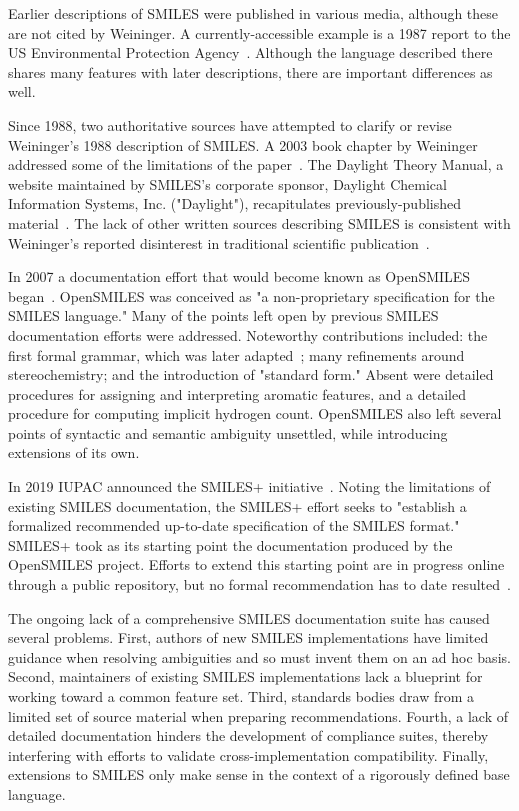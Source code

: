 \documentclass{article}
\begin{document}
Earlier descriptions of SMILES were published in various media, although these are not cited by Weininger. A currently-accessible example is a 1987 report to the US Environmental Protection Agency~\cite{anderson:1987}. Although the language described there shares many features with later descriptions, there are important differences as well.

Since 1988, two authoritative sources have attempted to clarify or revise Weininger's 1988 description of SMILES. A 2003 book chapter by Weininger addressed some of the limitations of the paper~\cite{weininger:2008}. The Daylight Theory Manual, a website maintained by SMILES's corporate sponsor, Daylight Chemical Information Systems, Inc. ("Daylight"), recapitulates previously-published material~\cite{daylightTheory}. The lack of other written sources describing SMILES is consistent with Weininger's reported disinterest in traditional scientific publication~\cite{gasteiger:2018}.

In 2007 a documentation effort that would become known as OpenSMILES began~\cite{openSMILES}. OpenSMILES was conceived as "a non-proprietary specification for the SMILES language." Many of the points left open by previous SMILES documentation efforts were addressed. Noteworthy contributions included: the first formal grammar, which was later adapted~\cite{denjoed:2010}; many refinements around stereochemistry; and the introduction of "standard form." Absent were detailed procedures for assigning and interpreting aromatic features, and a detailed procedure for computing implicit hydrogen count. OpenSMILES also left several points of syntactic and semantic ambiguity unsettled, while introducing extensions of its own.

In 2019 IUPAC announced the SMILES+ initiative~\cite{smilesPlusSpecification}. Noting the limitations of existing SMILES documentation, the SMILES+ effort seeks to "establish a formalized recommended up-to-date specification of the SMILES format." SMILES+ took as its starting point the documentation produced by the OpenSMILES project. Efforts to extend this starting point are in progress online through a public repository, but no formal recommendation has to date resulted~\cite{smilesPlusGitHub}.

The ongoing lack of a comprehensive SMILES documentation suite has caused several problems. First, authors of new SMILES implementations have limited guidance when resolving ambiguities and so must invent them on an ad hoc basis. Second, maintainers of existing SMILES implementations lack a blueprint for working toward a common feature set. Third, standards bodies draw from a limited set of source material when preparing recommendations. Fourth, a lack of detailed documentation hinders the development of compliance suites, thereby interfering with efforts to validate cross-implementation compatibility. Finally, extensions to SMILES only make sense in the context of a rigorously defined base language.
\end{document}
